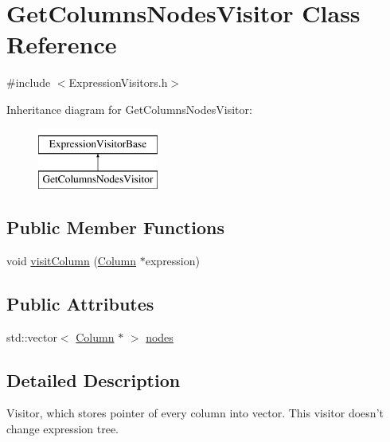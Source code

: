 \hypertarget{class_get_columns_nodes_visitor}{\section{Get\+Columns\+Nodes\+Visitor Class Reference}
\label{class_get_columns_nodes_visitor}
}


{\ttfamily \#include $<$Expression\+Visitors.\+h$>$}

Inheritance diagram for Get\+Columns\+Nodes\+Visitor\+:\begin{figure}[H]
\begin{center}
\leavevmode
\includegraphics[height=2.000000cm]{class_get_columns_nodes_visitor}
\end{center}
\end{figure}
\subsection*{Public Member Functions}
\begin{DoxyCompactItemize}
\item 
void \hyperlink{class_get_columns_nodes_visitor_adcd58020e010392df2b543b6a4bbc46b}{visit\+Column} (\hyperlink{class_column}{Column} $\ast$expression)
\end{DoxyCompactItemize}
\subsection*{Public Attributes}
\begin{DoxyCompactItemize}
\item 
std\+::vector$<$ \hyperlink{class_column}{Column} $\ast$ $>$ \hyperlink{class_get_columns_nodes_visitor_ac68ee0c1090596d4e25a5dc5a478533b}{nodes}
\end{DoxyCompactItemize}


\subsection{Detailed Description}
Visitor, which stores pointer of every column into vector. This visitor doesn't change expression tree. 

